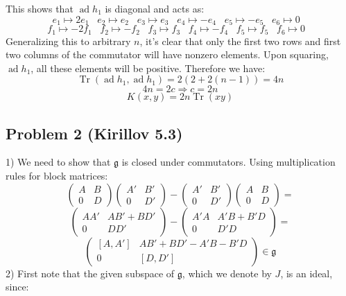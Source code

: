 \documentclass[12 pt]{article}
\newcommand{\fr}{\mathfrak}
\DeclareMathOperator{\Tr}{Tr}
\DeclareMathOperator {\ad} {ad}
\begin{document}
This shows that $\ad h_1$ is diagonal and acts as:
\[      e_1 \mapsto 2e_1 \;\;\;  e_2 \mapsto e_2 \;\;\; e_3 \mapsto e_3 \;\;\; e_4 \mapsto -e_4 \;\;\; e_5 \mapsto -e_5 \;\;\; e_6 \mapsto 0 \;\;\;    \] 
\[      f_1 \mapsto -2f_1 \;\;\;  f_2 \mapsto -f_2 \;\;\; f_3 \mapsto f_3 \;\;\; f_4 \mapsto -f_4 \;\;\; f_5 \mapsto f_5 \;\;\; f_6 \mapsto 0 \;\;\;    \]        
Generalizing this to arbitrary $n$, it's clear that only the first two rows and first two columns of the commutator will have nonzero elements. Upon squaring, $\ad h_1$, all these elements will be positive. Therefore we have:
\[        \Tr(\ad h_1, \ad h_1) = 2 ( 2 + 2(n-1) ) = 4n          \]
\[          4n = 2c \Rightarrow c = 2n       \]
\[         K(x,y) = 2n \Tr(xy)      \]



\subsection*{Problem 2 (Kirillov 5.3)}
1) We need to show that $\fr g$ is closed under commutators. Using multiplication rules for block matrices:
\[    \left(\begin{array}{cc}A & B \\ 0 & D\end{array}\right)  \left(\begin{array}{cc}A' & B' \\ 0 & D'\end{array}\right) - \left(\begin{array}{cc}A' & B' \\ 0 & D'\end{array}\right) \left(\begin{array}{cc}A & B \\ 0 & D\end{array}\right)  =  \]
\[        \left(\begin{array}{cc}AA' & AB' + BD' \\ 0 & DD'\end{array}\right)  - \left(\begin{array}{cc}A'A & A'B+ B'D \\ 0 & D'D\end{array}\right) =    \]
\[           \left(\begin{array}{cc}[A,A'] & AB' + BD' - A'B - B'D \\ 0 & [D,D']\end{array}\right)    \in \fr g   \]
2) First note that the given subspace of $\fr g$, which we denote by $J$, is an ideal, since:
\end{document}
